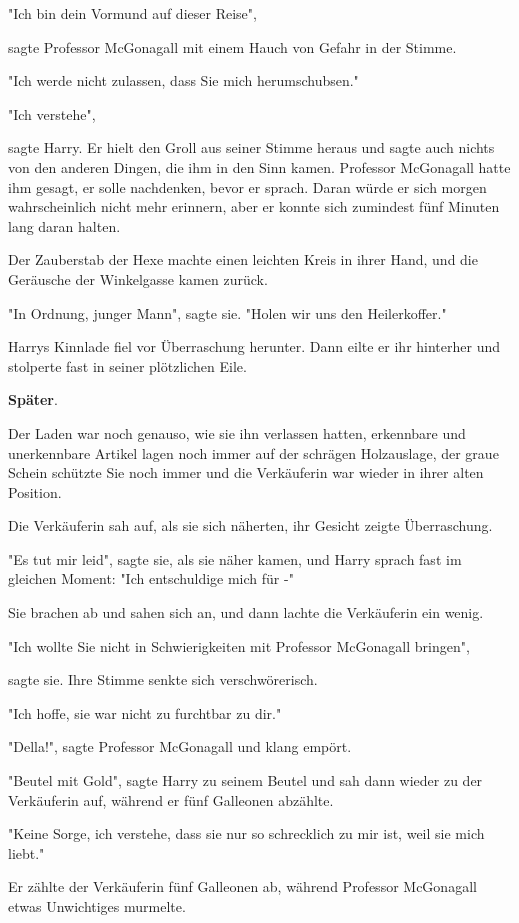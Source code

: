 {"Ich bin dein Vormund auf dieser Reise",

sagte Professor McGonagall mit einem Hauch von Gefahr in der Stimme.

"Ich werde nicht zulassen, dass Sie mich herumschubsen."

"Ich verstehe",

sagte Harry. Er hielt den Groll aus seiner Stimme heraus und sagte auch nichts von den anderen Dingen, die ihm in den Sinn kamen. Professor McGonagall hatte ihm gesagt, er solle nachdenken, bevor er sprach. Daran würde er sich morgen wahrscheinlich nicht mehr erinnern, aber er konnte sich zumindest fünf Minuten lang daran halten.

Der Zauberstab der Hexe machte einen leichten Kreis in ihrer Hand, und die Geräusche der Winkelgasse kamen zurück.

"In Ordnung, junger Mann", sagte sie. "Holen wir uns den Heilerkoffer."

Harrys Kinnlade fiel vor Überraschung herunter. Dann eilte er ihr hinterher und stolperte fast in seiner plötzlichen Eile.

\textbf{Später}.

Der Laden war noch genauso, wie sie ihn verlassen hatten, erkennbare und unerkennbare Artikel lagen noch immer auf der schrägen Holzauslage, der graue Schein schützte Sie noch immer und die Verkäuferin war wieder in ihrer alten Position.

Die Verkäuferin sah auf, als sie sich näherten, ihr Gesicht zeigte Überraschung.

"Es tut mir leid", sagte sie, als sie näher kamen, und Harry sprach fast im gleichen Moment: "Ich entschuldige mich für -"

Sie brachen ab und sahen sich an, und dann lachte die Verkäuferin ein wenig.

"Ich wollte Sie nicht in Schwierigkeiten mit Professor McGonagall bringen",

sagte sie. Ihre Stimme senkte sich verschwörerisch.

"Ich hoffe, sie war nicht zu furchtbar zu dir."

"Della!", sagte Professor McGonagall und klang empört.

"Beutel mit Gold", sagte Harry zu seinem Beutel und sah dann wieder zu der Verkäuferin auf, während er fünf Galleonen abzählte.

"Keine Sorge, ich verstehe, dass sie nur so schrecklich zu mir ist, weil sie mich liebt."

Er zählte der Verkäuferin fünf Galleonen ab, während Professor McGonagall etwas Unwichtiges murmelte.

}
